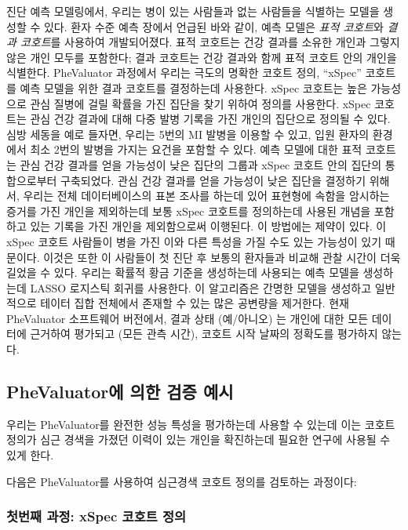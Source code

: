 \documentclass[11pt]{book}
\theoremstyle{definition}
\theoremstyle{definition}
\theoremstyle{definition}
\theoremstyle{remark}
\begin{document}
진단 예측 모델링에서, 우리는 병이 있는 사람들과 없는 사람들을 식별하는
모델을 생성할 수 있다. 환자 수준 예측 장에서 언급된 바와 같이, 예측
모델은 \emph{표적 코호트}와 \emph{결과 코호트}를 사용하여 개발되어졌다.
표적 코호트는 건강 결과를 소유한 개인과 그렇지 않은 개인 모두를
포함한다; 결과 코호트는 건강 결과와 함께 표적 코호트 안의 개인을
식별한다. PheValuator 과정에서 우리는 극도의 명확한 코호트 정의,
``xSpec'' 코호트를 예측 모델을 위한 결과 코호트를 결정하는데 사용한다.
xSpec 코호트는 높은 가능성으로 관심 질병에 걸릴 확률을 가진 집단을 찾기
위하여 정의를 사용한다. xSpec 코호트는 관심 건강 결과에 대해 다중 발병
기록을 가진 개인의 집단으로 정의될 수 있다. 심방 세동을 예로 들자면,
우리는 5번의 MI 발병을 이용할 수 있고, 입원 환자의 환경에서 최소 2번의
발병을 가지는 요건을 포함할 수 있다. 예측 모델에 대한 표적 코호트는 관심
건강 결과를 얻을 가능성이 낮은 집단의 그룹과 xSpec 코호트 안의 집단의
통합으로부터 구축되었다. 관심 건강 결과를 얻을 가능성이 낮은 집단을
결정하기 위해서, 우리는 전체 데이터베이스의 표본 조사를 하는데 있어
표현형에 속함을 암시하는 증거를 가진 개인을 제외하는데 보통 xSpec
코호트를 정의하는데 사용된 개념을 포함하고 있는 기록을 가진 개인을
제외함으로써 이행된다. 이 방법에는 제약이 있다. 이 xSpec 코호트 사람들이
병을 가진 이와 다른 특성을 가질 수도 있는 가능성이 있기 때문이다. 이것은
또한 이 사람들이 첫 진단 후 보통의 환자들과 비교해 관찰 시간이 더욱
길었을 수 있다. 우리는 확률적 황금 기준을 생성하는데 사용되는 예측
모델을 생성하는데 LASSO 로지스틱 회귀를 사용한다. \citep{suchard_2013}
이 알고리즘은 간명한 모델을 생성하고 일반적으로 테이터 집합 전체에서
존재할 수 있는 많은 공변량을 제거한다. 현재 PheValuator 소프트웨어
버전에서, 결과 상태 (예/아니오) 는 개인에 대한 모든 데이터에 근거하여
평가되고 (모든 관측 시간), 코호트 시작 날짜의 정확도를 평가하지 않는다.

\subsection{PheValuator에 의한 검증 예시}\label{phevaluator---}

우리는 PheValuator를 완전한 성능 특성을 평가하는데 사용할 수 있는데 이는
코호트 정의가 심근 경색을 가졌던 이력이 있는 개인을 확진하는데 필요한
연구에 사용될 수 있게 한다.

다음은 PheValuator를 사용하여 심근경색 코호트 정의를 검토하는 과정이다:

\subsubsection*{첫번째 과정: xSpec 코호트 정의}\label{--xspec--}
\end{document}
